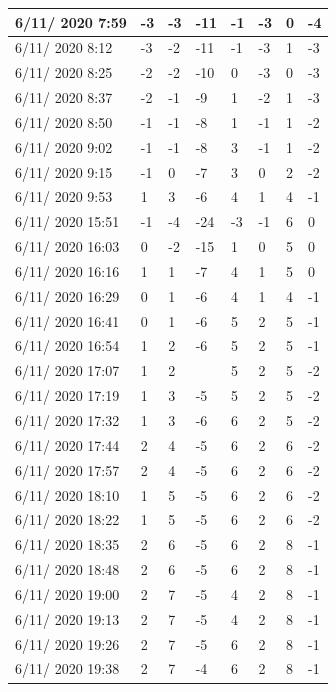 \begin{table}[h]
\begin{tabular}{|p{3cm}|p{1cm}|p{1cm}|p{1cm}|p{1cm}|p{1cm}|p{1cm}|p{1cm}|}
6/11/ 2020 7:59&	-3&	-3&	-11&-1&	-3&	0&	-4 \\ \hline
6/11/ 2020 8:12&	-3&	-2&	-11&-1&	-3&	1&	-3 \\ \hline
6/11/ 2020 8:25&	-2&	-2&	-10&0&	-3&	0&	-3 \\ \hline
6/11/ 2020 8:37&	-2&	-1&	-9&	1&	-2&	1&	-3 \\ \hline
6/11/ 2020 8:50&	-1&	-1&	-8&	1&	-1&	1&	-2 \\ \hline
6/11/ 2020 9:02&	-1&	-1&	-8&	3&	-1&	1&	-2 \\ \hline
6/11/ 2020 9:15&	-1&	0&	-7&	3&	0&	2&	-2 \\ \hline
6/11/ 2020 9:53&	1&	3&	-6&	4&	1&	4&	-1 \\ \hline
6/11/ 2020 15:51&	-1&	-4&	-24&-3&	-1&	6&	0 \\ \hline
6/11/ 2020 16:03&	0&	-2&	-15&1&	0&	5&	0 \\ \hline
6/11/ 2020 16:16&	1&	1&	-7&	4&	1&	5&	0 \\ \hline
6/11/ 2020 16:29&	0&	1&	-6&	4&	1&	4&	-1 \\ \hline
6/11/ 2020 16:41&	0&	1&	-6&	5&	2&	5&	-1 \\ \hline
6/11/ 2020 16:54&	1&	2&	-6&	5&	2&	5&	-1 \\ \hline
6/11/ 2020 17:07&	1&	2&	  &	5&	2&	5&	-2 \\ \hline
6/11/ 2020 17:19&	1&	3&	-5&	5&	2&	5&	-2 \\ \hline
6/11/ 2020 17:32&	1&	3&	-6&	6&	2&	5&	-2 \\ \hline
6/11/ 2020 17:44&	2&	4&	-5&	6&	2&	6&	-2 \\ \hline
6/11/ 2020 17:57&	2&	4&	-5&	6&	2&	6&	-2 \\ \hline
6/11/ 2020 18:10&	1&	5&	-5&	6&	2&	6&	-2 \\ \hline
6/11/ 2020 18:22&	1&	5&	-5&	6&	2&	6&	-2 \\ \hline
6/11/ 2020 18:35&	2&	6&	-5&	6&	2&	8&	-1 \\ \hline
6/11/ 2020 18:48&	2&	6&	-5&	6&	2&	8&	-1 \\ \hline
6/11/ 2020 19:00&	2&	7&	-5&	4&	2&	8&	-1 \\ \hline
6/11/ 2020 19:13&	2&	7&	-5&	4&	2&	8&	-1 \\ \hline
6/11/ 2020 19:26&	2&	7&	-5&	6&	2&	8&	-1 \\ \hline
6/11/ 2020 19:38&	2&	7&	-4&	6&	2&	8&	-1 \\ \hline
    \end{tabular}
\end{table}
